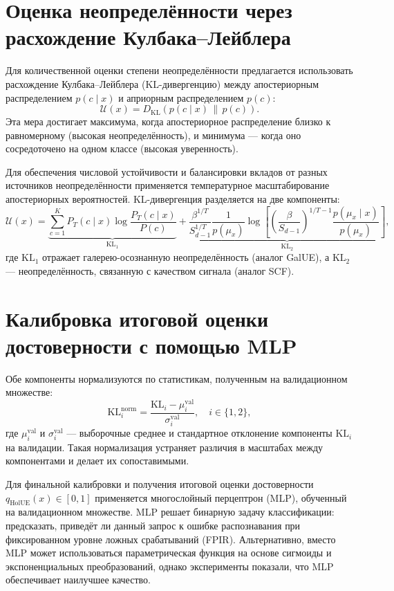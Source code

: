 \section{Оценка неопределённости через расхождение Кулбака–Лейблера}\label{sec:holue/kl_divergence}
Для количественной оценки степени неопределённости предлагается использовать расхождение Кулбака–Лейблера (KL-дивергенцию) между апостериорным распределением \(p(c \mid x)\) и априорным распределением \(p(c)\):  
\[
\mathcal{U}(x) = D_{\mathrm{KL}}\!\left( p(c \mid x) \,\|\, p(c) \right).
\]  
Эта мера достигает максимума, когда апостериорное распределение близко к равномерному (высокая неопределённость), и минимума — когда оно сосредоточено на одном классе (высокая уверенность).  

Для обеспечения числовой устойчивости и балансировки вкладов от разных источников неопределённости применяется температурное масштабирование апостериорных вероятностей.  
KL-дивергенция разделяется на две компоненты:  
\[
\mathcal{U}(x) = \underbrace{\sum_{c=1}^K P_T(c \mid x) \log \frac{P_T(c \mid x)}{P(c)}}_{\text{KL}_1} + \underbrace{\frac{\beta^{1/T}}{S_{d-1}^{1/T}} \frac{1}{p(\mu_x)} \log\!\left[ \left(\frac{\beta}{S_{d-1}}\right)^{1/T - 1} \frac{p(\mu_x \mid x)}{p(\mu_x)} \right]}_{\text{KL}_2},
\]  
где \(\text{KL}_1\) отражает галерею-осознанную неопределённость (аналог GalUE), а \(\text{KL}_2\) — неопределённость, связанную с качеством сигнала (аналог SCF).  
\section{Калибровка итоговой оценки достоверности с помощью MLP}\label{sec:holue/calibration}
Обе компоненты нормализуются по статистикам, полученным на валидационном множестве:  
\[
\text{KL}^{\text{norm}}_i = \frac{\text{KL}_i - \mu_i^{\text{val}}}{\sigma_i^{\text{val}}}, \quad i \in \{1, 2\},
\]  
где \(\mu_i^{\text{val}}\) и \(\sigma_i^{\text{val}}\) — выборочные среднее и стандартное отклонение компоненты \(\text{KL}_i\) на валидации.  
Такая нормализация устраняет различия в масштабах между компонентами и делает их сопоставимыми.  

Для финальной калибровки и получения итоговой оценки достоверности \(q_{\text{HolUE}}(x) \in [0,1]\) применяется многослойный перцептрон (MLP), обученный на валидационном множестве.  
MLP решает бинарную задачу классификации: предсказать, приведёт ли данный запрос к ошибке распознавания при фиксированном уровне ложных срабатываний (FPIR).  
Альтернативно, вместо MLP может использоваться параметрическая функция на основе сигмоиды и экспоненциальных преобразований, однако эксперименты показали, что MLP обеспечивает наилучшее качество.  

